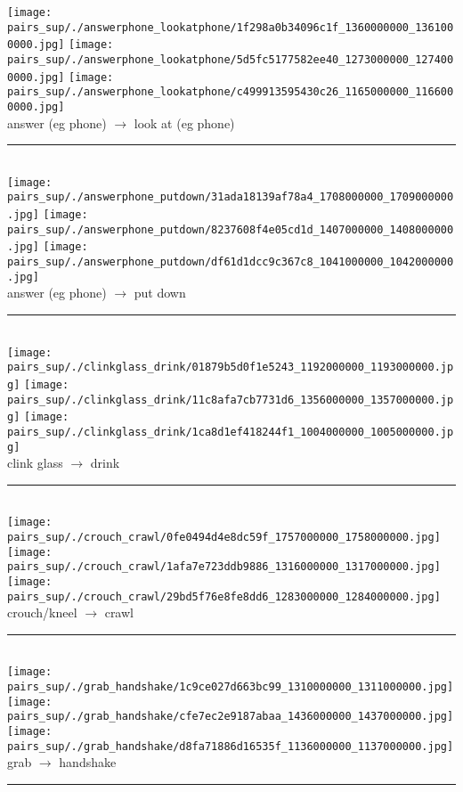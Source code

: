 \documentclass[10pt,twocolumn,letterpaper]{article}
\begin{document}
\begin{figure*}[t]
\centering
\texttt{[image: pairs\_sup/./answerphone\_lookatphone/1f298a0b34096c1f\_1360000000\_1361000000.jpg]}\hfill
\texttt{[image: pairs\_sup/./answerphone\_lookatphone/5d5fc5177582ee40\_1273000000\_1274000000.jpg]}\hfill
\texttt{[image: pairs\_sup/./answerphone\_lookatphone/c499913595430c26\_1165000000\_1166000000.jpg]}
\\
answer (eg phone) $\rightarrow$ look at (eg phone)
\noindent\rule{\textwidth}{1pt}\\[1em]
\texttt{[image: pairs\_sup/./answerphone\_putdown/31ada18139af78a4\_1708000000\_1709000000.jpg]}\hfill
\texttt{[image: pairs\_sup/./answerphone\_putdown/8237608f4e05cd1d\_1407000000\_1408000000.jpg]}\hfill
\texttt{[image: pairs\_sup/./answerphone\_putdown/df61d1dcc9c367c8\_1041000000\_1042000000.jpg]}
\\
answer (eg phone) $\rightarrow$ put down
\noindent\rule{\textwidth}{1pt}\\[1em]
\texttt{[image: pairs\_sup/./clinkglass\_drink/01879b5d0f1e5243\_1192000000\_1193000000.jpg]}\hfill
\texttt{[image: pairs\_sup/./clinkglass\_drink/11c8afa7cb7731d6\_1356000000\_1357000000.jpg]}\hfill
\texttt{[image: pairs\_sup/./clinkglass\_drink/1ca8d1ef418244f1\_1004000000\_1005000000.jpg]}
\\
clink glass $\rightarrow$ drink
\noindent\rule{\textwidth}{1pt}\\[1em]
\texttt{[image: pairs\_sup/./crouch\_crawl/0fe0494d4e8dc59f\_1757000000\_1758000000.jpg]}\hfill
\texttt{[image: pairs\_sup/./crouch\_crawl/1afa7e723ddb9886\_1316000000\_1317000000.jpg]}\hfill
\texttt{[image: pairs\_sup/./crouch\_crawl/29bd5f76e8fe8dd6\_1283000000\_1284000000.jpg]}
\\
crouch/kneel $\rightarrow$ crawl
\noindent\rule{\textwidth}{1pt}\\[1em]
\texttt{[image: pairs\_sup/./grab\_handshake/1c9ce027d663bc99\_1310000000\_1311000000.jpg]}\hfill
\texttt{[image: pairs\_sup/./grab\_handshake/cfe7ec2e9187abaa\_1436000000\_1437000000.jpg]}\hfill
\texttt{[image: pairs\_sup/./grab\_handshake/d8fa71886d16535f\_1136000000\_1137000000.jpg]}
\\
grab $\rightarrow$ handshake
\noindent\rule{\textwidth}{1pt}\\[1em]

\end{figure*}
\end{document}
